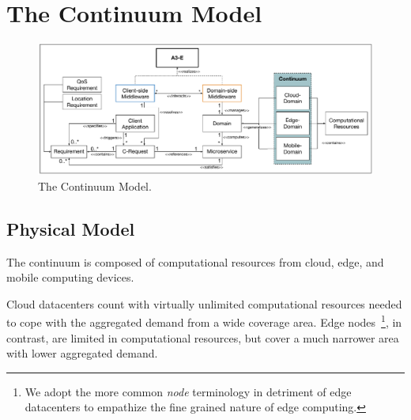 \section{The Continuum Model}\label{sec:proposal}

\begin{figure}[tbp]
	\includegraphics[width=1\textwidth]{figs/A3-E-model.pdf}
	\caption{The Continuum Model.}
	\label{fig:Continuum-model}
\end{figure}



\subsection{Physical Model}


The continuum is composed of computational resources from cloud, edge, and mobile computing devices. 

Cloud datacenters count with virtually unlimited computational resources needed to cope with the aggregated demand from a wide coverage area. Edge nodes~\footnote{We adopt the more common \textit{node} terminology in detriment of edge datacenters to empathize the fine grained nature of edge computing.}, in contrast, are limited in computational resources, but cover a much narrower area with lower aggregated demand. 

